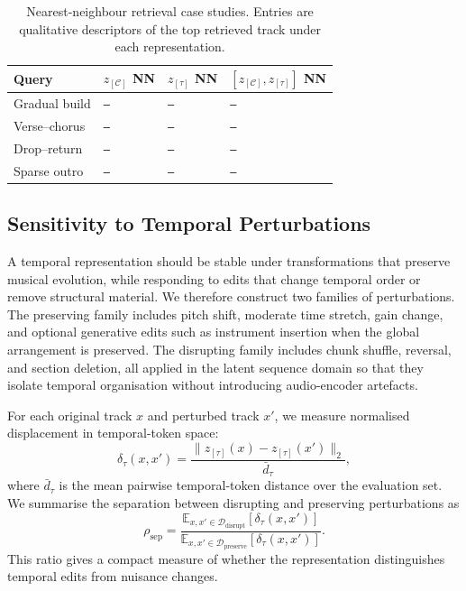 \documentclass{article}
\newcommand{\zC}{z_{[\mathcal{C}]}}    %
\newcommand{\ztau}{z_{[\tau]}}          %
\newcommand{\res}{\texttt{--}}
\begin{document}
\begin{table}[t]
  \centering
  \setlength{\tabcolsep}{3.0pt}
  \caption{Nearest-neighbour retrieval case studies.  Entries are
    qualitative descriptors of the top retrieved track under each
  representation.}
  \label{tab:temporal_retrieval}
  \begin{tabular}{llll}
    \toprule
    \textbf{Query} & $\zC$ NN & $\ztau$ NN & $[\zC,\ztau]$ NN \\
    \midrule
    Gradual build & \res & \res & \res \\
    Verse--chorus & \res & \res & \res \\
    Drop--return & \res & \res & \res \\
    Sparse outro & \res & \res & \res \\
    \bottomrule
  \end{tabular}
\end{table}

\subsection{Sensitivity to Temporal Perturbations}
\label{ssec:exp_perturbations}

A temporal representation should be stable under transformations
that preserve musical evolution, while responding to edits that
change temporal order or remove structural material.  We therefore
construct two families of perturbations.  The preserving family
includes pitch shift, moderate time stretch, gain change, and
optional generative edits such as instrument insertion when the
global arrangement is preserved.  The disrupting family includes
chunk shuffle, reversal, and section deletion, all applied in the
latent sequence domain so that they isolate temporal organisation
without introducing audio-encoder artefacts.

For each original track $x$ and perturbed track $x'$, we measure
normalised displacement in temporal-token space:
%
\begin{equation}
  \delta_\tau(x,x')
  =
  \frac{
    \|\ztau(x)-\ztau(x')\|_2
  }{
    \bar{d}_\tau
  },
  \label{eq:normalised_token_displacement}
\end{equation}
%
where $\bar{d}_\tau$ is the mean pairwise temporal-token distance
over the evaluation set.  We summarise the separation between
disrupting and preserving perturbations as
%
\begin{equation}
  \rho_{\mathrm{sep}}
  =
  \frac{
    \mathbb{E}_{x,x'\in\mathcal{D}_{\mathrm{disrupt}}}
    [\delta_\tau(x,x')]
  }{
    \mathbb{E}_{x,x'\in\mathcal{D}_{\mathrm{preserve}}}
    [\delta_\tau(x,x')]
  }.
  \label{eq:perturbation_separation}
\end{equation}
%
This ratio gives a compact measure of whether the representation
distinguishes temporal edits from nuisance changes.
\end{document}
